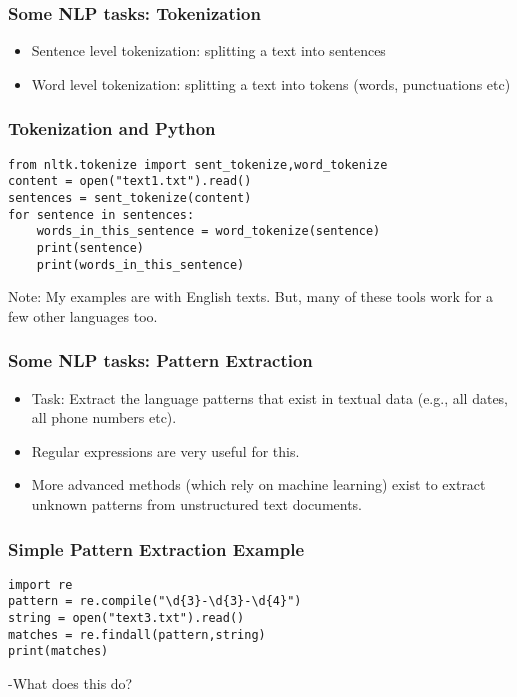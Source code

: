 \documentclass{beamer}
\begin{document}
\begin{frame}
\frametitle{Some NLP tasks: Tokenization}
\begin{itemize}
\item Sentence level tokenization: splitting a text into sentences
\item Word level tokenization: splitting a text into tokens (words, punctuations etc)
\end{itemize}
\end{frame}

\begin{frame}[fragile]
\frametitle{Tokenization and Python}
\small
\begin{verbatim}
from nltk.tokenize import sent_tokenize,word_tokenize
content = open("text1.txt").read()
sentences = sent_tokenize(content)
for sentence in sentences:
    words_in_this_sentence = word_tokenize(sentence)
    print(sentence)
    print(words_in_this_sentence)
\end{verbatim}
Note: My examples are with English texts. But, many of these tools work for a few other languages too. 
\end{frame}

\begin{frame}
\frametitle{Some NLP tasks: Pattern Extraction}
\begin{itemize}
\item Task: Extract the language patterns that exist in textual data (e.g., all dates, all phone numbers etc). 
\item Regular expressions are very useful for this.
\item More advanced methods (which rely on machine learning) exist to extract unknown patterns from unstructured text documents.
\end{itemize}
\end{frame}

\begin{frame}[fragile]
\frametitle{Simple Pattern Extraction Example}
\small
\begin{verbatim}
import re
pattern = re.compile("\d{3}-\d{3}-\d{4}")
string = open("text3.txt").read()
matches = re.findall(pattern,string)
print(matches)
\end{verbatim}
-What does this do?
\end{frame}
\end{document}
